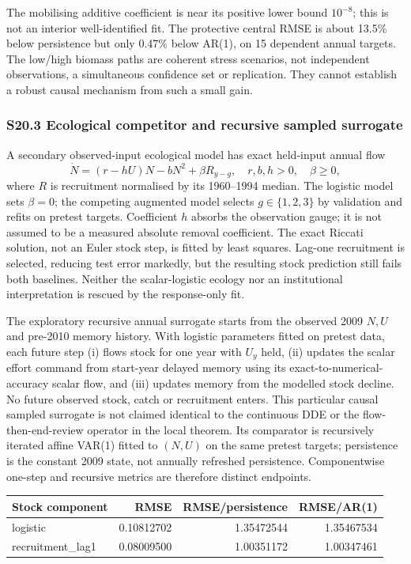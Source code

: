 \documentclass[
  10pt,
  a4paper,
]{article}
\begin{document}
The mobilising additive coefficient is near its positive lower bound
\(10^{-8}\); this is not an interior well-identified fit. The protective
central RMSE is about 13.5\% below persistence but only 0.47\% below
AR(1), on 15 dependent annual targets. The low/high biomass paths are
coherent stress scenarios, not independent observations, a simultaneous
confidence set or replication. They cannot establish a robust causal
mechanism from such a small gain.

\subsubsection{S20.3 Ecological competitor and recursive sampled
surrogate}\label{s20.3-ecological-competitor-and-recursive-sampled-surrogate}

A secondary observed-input ecological model has exact held-input annual
flow \[\dot N=(r-hU)N-bN^2+\beta R_{y-g},\quad r,b,h>0,\quad\beta\ge0,\]
where \(R\) is recruitment normalised by its 1960--1994 median. The
logistic model sets \(\beta=0\); the competing augmented model selects
\(g\in\{1,2,3\}\) by validation and refits on pretest targets.
Coefficient \(h\) absorbs the observation gauge; it is not assumed to be
a measured absolute removal coefficient. The exact Riccati solution, not
an Euler stock step, is fitted by least squares. Lag-one recruitment is
selected, reducing test error markedly, but the resulting stock
prediction still fails both baselines. Neither the scalar-logistic
ecology nor an institutional interpretation is rescued by the
response-only fit.

The exploratory recursive annual surrogate starts from the observed 2009
\(N,U\) and pre-2010 memory history. With logistic parameters fitted on
pretest data, each future step (i) flows stock for one year with \(U_y\)
held, (ii) updates the scalar effort command from start-year delayed
memory using its exact-to-numerical-accuracy scalar flow, and (iii)
updates memory from the modelled stock decline. No future observed
stock, catch or recruitment enters. This particular causal sampled
surrogate is not claimed identical to the continuous DDE or the
flow-then-end-review operator in the local theorem. Its comparator is
recursively iterated affine VAR(1) fitted to \((N,U)\) on the same
pretest targets; persistence is the constant 2009 state, not annually
refreshed persistence. Componentwise one-step and recursive metrics are
therefore distinct endpoints.

\begin{longtable}[]{@{}lrrr@{}}
\toprule\noalign{}
Stock component & RMSE & RMSE/persistence & RMSE/AR(1) \\
\midrule\noalign{}
\endhead
\bottomrule\noalign{}
\endlastfoot
logistic & 0.10812702 & 1.35472544 & 1.35467534 \\
recruitment\_lag1 & 0.08009500 & 1.00351172 & 1.00347461 \\
\end{longtable}
\end{document}
